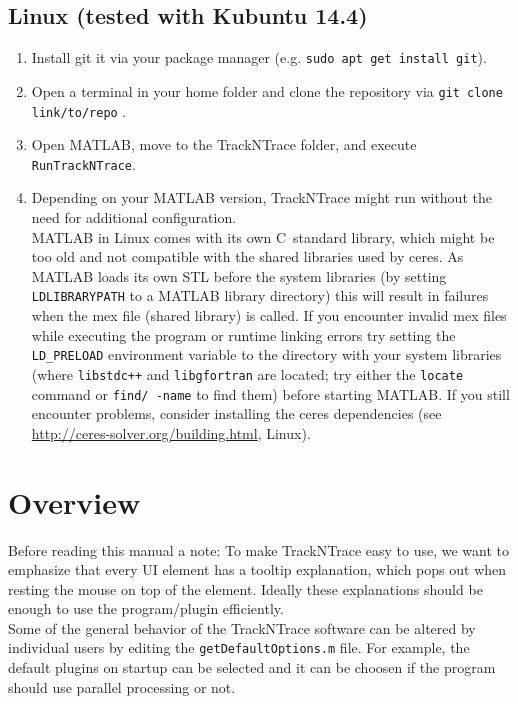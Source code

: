 \documentclass[11pt,onside]{report}
\numberwithin{equation}{chapter}
\def\CC{{C\nolinebreak[4]\hspace{-.05em}\raisebox{.3ex}{\tiny\bf ++}}}
\begin{document}
\subsection{Linux (tested with Kubuntu 14.4)}
\begin{enumerate}
\item Install git it via your package manager (e.g. \texttt{sudo apt get install git}).
\item Open a terminal in your home folder and clone the repository via \texttt{git clone link/to/repo} .
\item Open MATLAB, move to the TrackNTrace folder, and execute \texttt{RunTrackNTrace}.
\item Depending on your MATLAB version, TrackNTrace might run without the need for additional configuration.\\
MATLAB in Linux comes with its own \CC~standard library, which might be too old and not compatible with the shared libraries used by ceres. As MATLAB loads its own STL before the system libraries (by setting \texttt{LD\textunderscore LIBRARY\textunderscore PATH} to a MATLAB library directory) this will result  in failures when the mex file (shared library) is called. If you encounter invalid mex files while executing the program or runtime linking errors try setting the \texttt{LD\_PRELOAD} environment variable to the directory with your system libraries (where \texttt{libstdc++} and \texttt{libgfortran} are located; try either the \texttt{locate} command or \texttt{find/ -name} to find them) before starting MATLAB. If you still encounter problems, consider installing the ceres dependencies (see \url{http://ceres-solver.org/building.html}, Linux).
\end{enumerate}
\clearpage

\section{Overview}\label{sec:overview}
Before reading this manual a note: To make TrackNTrace easy to use, we want to emphasize that every UI element has a tooltip explanation, which pops out when resting the mouse on top of the element. Ideally these explanations should be enough to use the program/plugin efficiently.\\

Some of the general behavior of the TrackNTrace software can be altered by individual users by editing the \texttt{getDefaultOptions.m} file. For example, the default plugins on startup can be selected and it can be choosen if the program should use parallel processing or not.
\end{document}
